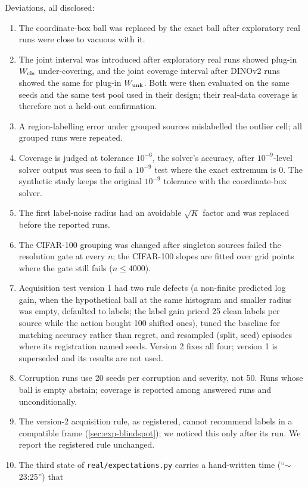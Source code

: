 Deviations, all disclosed:
\begin{enumerate}
\item The coordinate-box ball was replaced by the exact ball after exploratory real runs were close to
vacuous with it.
\item The joint interval was introduced after exploratory real runs showed plug-in $W_{\mathrm{cls}}$
under-covering, and the joint coverage interval after DINOv2 runs showed the same for plug-in $W_{\mathrm{unk}}$.
Both were then evaluated on the same seeds and the same test pool used in their design; their real-data
coverage is therefore not a held-out confirmation.
\item A region-labelling error under grouped sources mislabelled the outlier cell; all grouped runs
were repeated.
\item Coverage is judged at tolerance $10^{-6}$, the solver's accuracy, after $10^{-9}$-level solver
output was seen to fail a $10^{-9}$ test where the exact extremum is $0$. The synthetic study keeps the
original $10^{-9}$ tolerance with the coordinate-box solver.
\item The first label-noise radius had an avoidable $\sqrt K$ factor and was replaced before the reported
runs.
\item The CIFAR-100 grouping was changed after singleton sources failed the resolution gate at every
$n$; the CIFAR-100 slopes are fitted over grid points where the gate still fails ($n\le4000$).
\item Acquisition test version 1 had two rule defects (a non-finite predicted log gain, when the
hypothetical ball at the same histogram and smaller radius was empty, defaulted to labels; the label
gain priced 25 clean labels per source while the action bought 100 shifted ones), tuned the baseline
for matching accuracy rather than regret, and resampled (split, seed) episodes where its registration
named seeds. Version 2 fixes all four; version 1 is superseded and its results are not used.
\item Corruption runs use 20 seeds per corruption and severity, not 50. Runs whose ball is empty
abstain; coverage is reported among answered runs and unconditionally.
\item The version-2 acquisition rule, as registered, cannot recommend labels in a compatible frame
(\cref{sec:exp-blindspot}); we noticed this only after its run. We report the registered rule unchanged.
\item The third state of \texttt{real/expectations.py} carries a hand-written time (``$\sim$23:25'') that

\end{enumerate}
